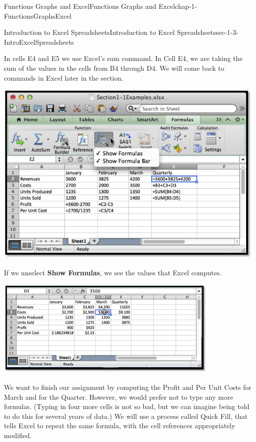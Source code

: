 \documentclass[oneside,10pt,]{book}
\newcommand{\terminology}[1]{\textbf{#1}}
\numberwithin{equation}{section}
\begin{document}
\begin{chapterptx}{Functions Graphs and Excel}{}{Functions Graphs and Excel}{}{}{chap-1-FunctionsGraphsExcel}
\begin{sectionptx}{Introduction to Excel Spreadsheets}{}{Introduction to Excel Spreadsheets}{}{}{sec-1-3-IntroExcelSpreadsheets}
\par
\hypertarget{p-238}{}%
In cells E4 and E5 we use Excel's sum command.  In Cell E4, we are taking the sum of the values in the cells from B4 through D4.  We will come back to commands in Excel later in the section.%
\begin{sidebyside}{1}{0.1}{0.1}{0}%
\begin{sbspanel}{0.8}%
\includegraphics[width=1\linewidth]{images/sec1-3-2ShowFormulas.png}
\end{sbspanel}%
\end{sidebyside}%
\par
\hypertarget{p-239}{}%
If we unselect \terminology{Show Formulas}, we see the values that Excel computes.%
\begin{sidebyside}{1}{0.1}{0.1}{0}%
\begin{sbspanel}{0.8}%
\includegraphics[width=1\linewidth]{images/sec1-3-3UnshowFormulas.png}
\end{sbspanel}%
\end{sidebyside}%
\par
\hypertarget{p-240}{}%
We want to finish our assignment by computing the Profit and Per Unit Costs for March and for the Quarter.  However, we would prefer not to type any more formulas.  (Typing in four more cells is not so bad, but we can imagine being told to do this for several years of data.)  We will use a process called Quick Fill, that tells Excel to repeat the same formula, with the cell references appropriately modified.%

\end{sectionptx}
\end{chapterptx}
\end{document}
